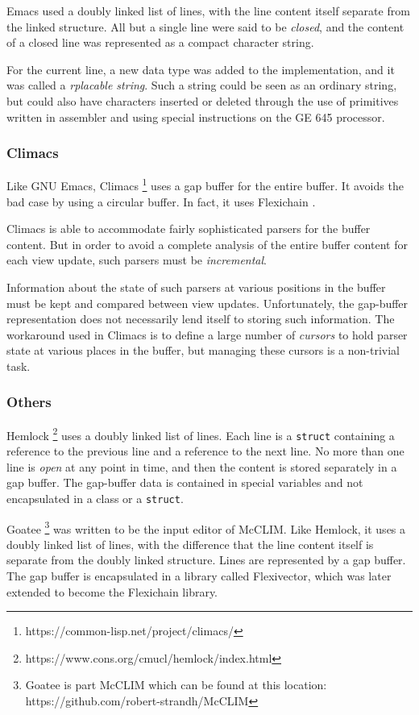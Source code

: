\multics{} Emacs used a doubly linked list of lines, with the line
content itself separate from the linked structure.  All but a single
line were said to be \emph{closed}, and the content of a closed line
was represented as a compact character string.

For the current line, a new \maclisp{} data type was added to the
\multics{} \maclisp{} implementation, and it was called a
\emph{rplacable string}.  Such a string could be seen as an ordinary
\maclisp{} string, but could also have characters inserted or deleted
through the use of primitives written in assembler and using special
instructions on the GE 645 processor.

\subsubsection{Climacs}

Like GNU Emacs, Climacs%
\footnote{https://common-lisp.net/project/climacs/}
uses a gap buffer for the entire buffer.  It
avoids the bad case by using a circular buffer.  In fact, it uses
Flexichain \cite{flexichain}.

Climacs is able to accommodate fairly sophisticated parsers for the
buffer content.  But in order to avoid a complete analysis of the
entire buffer content for each view update, such parsers must be
\emph{incremental}.

Information about the state of such parsers at various positions in
the buffer must be kept and compared between view updates.
Unfortunately, the gap-buffer representation does not necessarily lend
itself to storing such information.  The workaround used in Climacs is
to define a large number of \emph{cursors} to hold parser state at
various places in the buffer, but managing these cursors is a
non-trivial task.

\subsubsection{Others}

Hemlock%
\footnote{https://www.cons.org/cmucl/hemlock/index.html}
uses a doubly linked list of lines.  Each line is a \texttt{struct}
containing a reference to the previous line and a reference to the
next line.  No more than one line is \emph{open} at any point in time,
and then the content is stored separately in a gap buffer.  The
gap-buffer data is contained in special variables and not encapsulated
in a class or a \texttt{struct}.

Goatee%
\footnote{Goatee is part McCLIM which can be found at this location:
https://github.com/robert-strandh/McCLIM}
was written to be the input editor of McCLIM.  Like Hemlock, it
uses a doubly linked list of lines, with the difference that the line
content itself is separate from the doubly linked structure.  Lines
are represented by a gap buffer.  The gap buffer is encapsulated in
a library called Flexivector, which was later extended to become the
Flexichain library.
